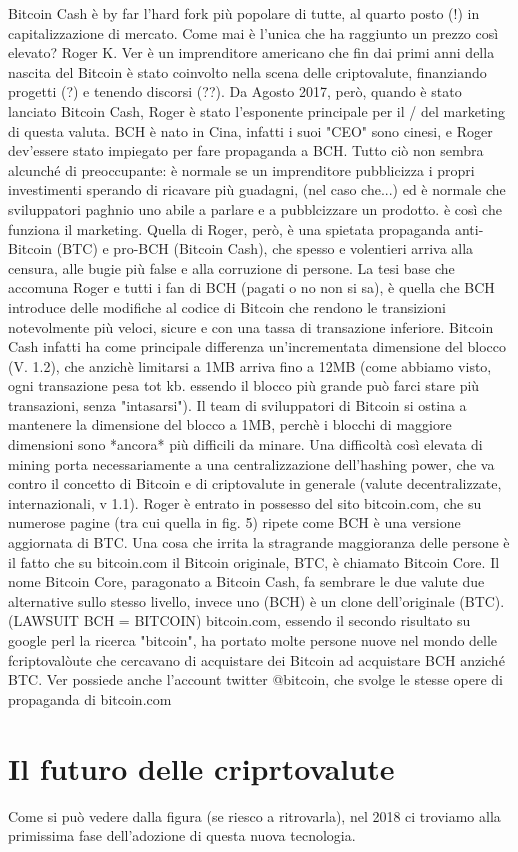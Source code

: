 \documentclass {article}
\begin{document}
Bitcoin Cash è by far l'hard fork più popolare di tutte, al quarto posto (!) in capitalizzazione di mercato. Come mai è l'unica che ha raggiunto un prezzo così elevato?
Roger K. Ver è un imprenditore americano che fin dai primi anni della nascita del Bitcoin è stato coinvolto nella scena delle criptovalute, finanziando progetti (?) e tenendo discorsi (??).
Da Agosto 2017, però, quando è stato lanciato Bitcoin Cash, Roger è stato l'esponente principale per il / del marketing di questa valuta. BCH è nato in Cina, infatti i suoi "CEO" sono cinesi, e Roger dev'essere stato impiegato per fare propaganda a BCH.
Tutto ciò non sembra alcunché di preoccupante: è normale se un imprenditore pubblicizza i propri investimenti sperando di ricavare più guadagni, (nel caso che...) ed è normale che sviluppatori paghnio uno abile a parlare e a pubblcizzare un prodotto.
è così che funziona il marketing.
Quella di Roger, però, è una spietata propaganda anti-Bitcoin (BTC) e pro-BCH (Bitcoin Cash), che spesso e volentieri arriva alla censura, alle bugie più false e alla corruzione di persone.
La tesi base che accomuna Roger e tutti i fan di BCH (pagati o no non si sa), è quella che BCH introduce delle modifiche al codice di Bitcoin che rendono le transizioni notevolmente più veloci, sicure e con una tassa di transazione inferiore. Bitcoin Cash infatti ha come principale differenza un'incrementata dimensione del blocco (V. 1.2), che anzichè limitarsi a 1MB arriva fino a 12MB (come abbiamo visto, ogni transazione pesa tot kb. essendo il blocco più grande può farci stare più transazioni, senza "intasarsi").
Il team di sviluppatori di Bitcoin si ostina a mantenere la dimensione del blocco a 1MB, perchè i blocchi di maggiore dimensioni sono *ancora* più difficili da minare.
Una difficoltà così elevata di mining porta necessariamente a una centralizzazione dell'hashing power, che va contro il concetto di Bitcoin e di criptovalute in generale (valute decentralizzate, internazionali, v 1.1).
Roger è entrato in possesso del sito bitcoin.com, che su numerose pagine (tra cui quella in fig. 5) ripete come BCH è una versione aggiornata di BTC. Una cosa che irrita la stragrande maggioranza delle persone è il fatto che su bitcoin.com il Bitcoin originale, BTC, è chiamato Bitcoin Core.
Il nome Bitcoin Core, paragonato a Bitcoin Cash, fa sembrare le due valute due alternative sullo stesso livello, invece uno (BCH) è un clone dell'originale (BTC). (LAWSUIT BCH = BITCOIN)
bitcoin.com, essendo il secondo risultato su google perl la ricerca "bitcoin", ha portato molte persone nuove nel mondo delle fcriptovalòute che cercavano di acquistare dei Bitcoin ad acquistare BCH anziché BTC.
Ver possiede anche l'account twitter @bitcoin, che svolge le stesse opere di propaganda di bitcoin.com


\section {Il futuro delle criprtovalute}


Come si può vedere dalla figura (se riesco a ritrovarla), nel 2018 ci troviamo alla primissima fase dell'adozione di questa nuova tecnologia.
\end{document}
